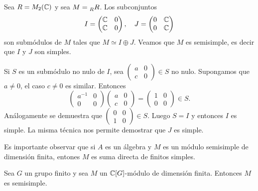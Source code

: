 \begin{example}
Sea $R=M_2(\mathbb{C})$ y sea $M=\prescript{}{R}R$. Los subconjuntos
\[
I=\begin{pmatrix}
\mathbb{C}&0\\
\mathbb{C}&0
\end{pmatrix},\quad
J=\begin{pmatrix}
0&\mathbb{C}\\
0&\mathbb{C}
\end{pmatrix}
\]
son submódulos de $M$ tales que $M\simeq I\oplus J$. Veamos que $M$ es semisimple, es decir que
$I$ y $J$ son simples. 

Si $S$ es un submódulo no nulo de $I$, sea 
$\begin{pmatrix}
a&0\\
c&0
\end{pmatrix}\in S$ no nulo. Supongamos que 
$a\ne 0$, el caso $c\ne 0$ es similar. Entonces
\[
\begin{pmatrix}
a^{-1} & 0\\
0 & 0\end{pmatrix}
\begin{pmatrix}
a&0\\
c&0
\end{pmatrix}
=\begin{pmatrix}
1&0\\
0&0
\end{pmatrix}\in S.
\]
Análogamente se demuestra que $\begin{pmatrix}0&0\\1&0\end{pmatrix}\in S$. Luego $S=I$ y entonces $I$ es simple.  
La misma técnica nos permite demostrar que $J$ es simple.
\end{example}

Es importante observar que si $A$ es un álgebra y $M$ es un módulo
semisimple de dimensión finita, entones $M$ es suma directa de finitos simples. 

\begin{theorem}[Maschke]
Sea $G$ un grupo finito y sea $M$ un $\mathbb{C}[G]$-módulo de dimensión finita. Entonces
$M$ es semisimple.
\end{theorem}

